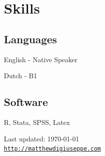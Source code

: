 \documentclass[letterpaper]{article}
\def\footerlink{http://matthewdigiuseppe.com}
\renewenvironment{itemize}{
  \begin{list}{}{
    \setlength{\leftmargin}{1.75em}
  }
}{
  \end{list}
}
\begin{document}
\section*{Skills}

\subsection*{Languages}
\begin{itemize}
	\item English - Native Speaker
	\item Dutch - B1
\end{itemize}

\subsection*{Software}
\begin{itemize}
	\item R, Stata, SPSS, Latex
\end{itemize}



\bigskip

\begin{center}
  \begin{footnotesize}
    Last updated: \today \\
    \href{\footerlink}{\texttt{\footerlink}}
  \end{footnotesize}
\end{center}
\end{document}
